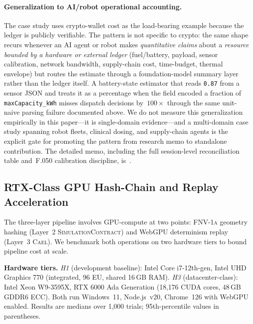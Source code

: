 \documentclass[letterpaper,twocolumn,10pt]{article}
\newcommand{\cael}{\textsc{Cael}}
\newcommand{\simcontract}{\textsc{SimulationContract}}
\newcommand{\fnvhash}{\textsc{FNV-1a}}
\begin{document}
\paragraph{Generalization to AI/robot operational accounting.} The
case study uses crypto-wallet cost as the load-bearing example
because the ledger is publicly verifiable. The pattern is not
specific to crypto: the same shape recurs whenever an AI agent or
robot makes \emph{quantitative claims} about a \emph{resource bounded
by a hardware or external ledger} (fuel/battery, payload, sensor
calibration, network bandwidth, supply-chain cost, time-budget,
thermal envelope) but routes the estimate through a foundation-model
summary layer rather than the ledger itself. A battery-state
estimator that reads \texttt{0.87} from a sensor JSON and treats it
as a percentage when the field encoded a fraction of
\texttt{maxCapacity\_kWh} misses dispatch decisions by~$100\times$
through the same unit-naive parsing failure documented above. We do
not measure this generalization empirically in this paper---it is
single-domain evidence---and a multi-domain case study spanning
robot fleets, clinical dosing, and supply-chain agents is the
explicit gate for promoting the pattern from research memo to
standalone contribution. The detailed memo, including the full
session-level reconciliation table and~F.050 calibration discipline,
is~\cite{provenance-cost-accounting-2026-05-11}.

\subsection{RTX-Class GPU Hash-Chain and Replay Acceleration}
\label{sec:eval-rtx}

The three-layer pipeline involves GPU-compute at two points: \fnvhash{}
geometry hashing (Layer~2 \simcontract{}) and WebGPU determinism replay
(Layer~3 \cael{}).  We benchmark both operations on two hardware tiers to
bound pipeline cost at scale.

\textbf{Hardware tiers.}
\emph{H1} (development baseline): Intel Core i7-12th-gen, Intel UHD
Graphics 770 (integrated, 96 EU, shared 16\,GB RAM).
\emph{H3} (datacenter-class): Intel Xeon W9-3595X, RTX 6000 Ada Generation
(18,176 CUDA cores, 48\,GB GDDR6 ECC).
Both run Windows~11, Node.js~v20, Chrome~126 with WebGPU enabled.
Results are medians over 1,000 trials; 95th-percentile values in
parentheses.
\end{document}
